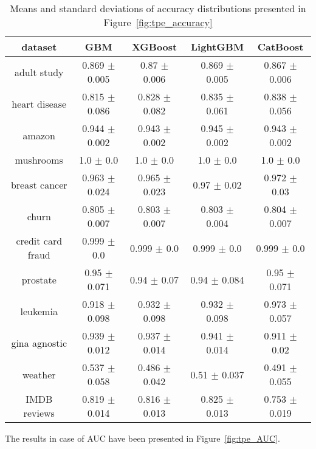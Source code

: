 \documentclass[magisterska, english]{pwr_wmat_praca_dyplomowa}
\theoremstyle{plain}
\numberwithin{theorem}{chapter}
\theoremstyle{definition}
\numberwithin{theorem}{chapter}
\begin{document}
\begin{table}[h!]
\centering
\begin{tabular}{|c|c|c|c|c|}
\hline
\textbf{dataset}  & \textbf{GBM}  & \textbf{XGBoost}  & \textbf{LightGBM}  & \textbf{CatBoost} \\ \hline
adult study & 0.869 $\pm$ 0.005 & \cellcolor{green}0.87 $\pm$ 0.006 & 0.869 $\pm$ 0.005 & \cellcolor{red}0.867 $\pm$ 0.006\\ \hline
heart disease & \cellcolor{red}0.815 $\pm$ 0.086 & 0.828 $\pm$ 0.082 & 0.835 $\pm$ 0.061 & \cellcolor{green}0.838 $\pm$ 0.056\\ \hline
amazon & 0.944 $\pm$ 0.002 & \cellcolor{red}0.943 $\pm$ 0.002 & \cellcolor{green}0.945 $\pm$ 0.002 & \cellcolor{red}0.943 $\pm$ 0.002\\ \hline
mushrooms & 1.0 $\pm$ 0.0 & 1.0 $\pm$ 0.0 & 1.0 $\pm$ 0.0 & 1.0 $\pm$ 0.0\\ \hline
breast cancer & \cellcolor{red}0.963 $\pm$ 0.024 & 0.965 $\pm$ 0.023 & 0.97 $\pm$ 0.02 & \cellcolor{green}0.972 $\pm$ 0.03\\ \hline
churn & \cellcolor{green}0.805 $\pm$ 0.007 & \cellcolor{red}0.803 $\pm$ 0.007 & 0.803 $\pm$ 0.004 & 0.804 $\pm$ 0.007\\ \hline
credit card fraud & 0.999 $\pm$ 0.0 & 0.999 $\pm$ 0.0 & 0.999 $\pm$ 0.0 & 0.999 $\pm$ 0.0\\ \hline
prostate & \cellcolor{green}0.95 $\pm$ 0.071 & 0.94 $\pm$ 0.07 & \cellcolor{red}0.94 $\pm$ 0.084 & \cellcolor{green}0.95 $\pm$ 0.071\\ \hline
leukemia & \cellcolor{red}0.918 $\pm$ 0.098 & 0.932 $\pm$ 0.098 & 0.932 $\pm$ 0.098 & \cellcolor{green}0.973 $\pm$ 0.057\\ \hline
gina agnostic & 0.939 $\pm$ 0.012 & 0.937 $\pm$ 0.014 & \cellcolor{green}0.941 $\pm$ 0.014 & \cellcolor{red}0.911 $\pm$ 0.02\\ \hline
weather & \cellcolor{green}0.537 $\pm$ 0.058 & \cellcolor{red}0.486 $\pm$ 0.042 & 0.51 $\pm$ 0.037 & 0.491 $\pm$ 0.055\\ \hline
IMDB reviews & 0.819 $\pm$ 0.014 & 0.816 $\pm$ 0.013 & \cellcolor{green}0.825 $\pm$ 0.013 & \cellcolor{red}0.753 $\pm$ 0.019\\ \hline
\end{tabular}
\caption{Means and standard deviations of accuracy distributions presented in Figure~\ref{fig:tpe_accuracy}}
\label{tab:tpe_accuracy}
\end{table}

The results in case of AUC have been presented in Figure~\ref{fig:tpe_AUC}.
\end{document}
